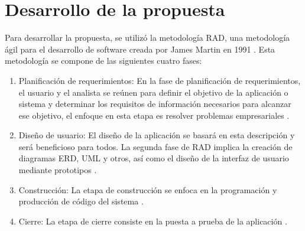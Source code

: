 \section{Desarrollo de la propuesta}
Para desarrollar la propuesta, se utilizó la metodología RAD, una metodología ágil para el desarrollo de software
creada por James Martin en 1991 \cite{agrawalUSINGRAPIDAPPLICATION2019}. Esta metodología se compone de las
siguientes cuatro fases:

\begin{enumerate}
    \item Planificación de requerimientos: En la fase de planificación de requerimientos, el usuario y el analista
          se reúnen para definir el objetivo de la aplicación o sistema y determinar los requisitos de información
          necesarios para alcanzar ese objetivo, el enfoque en esta etapa es resolver problemas empresariales \cite{maulanyDesignLearningApplications2021}.
    \item Diseño de usuario: El diseño de la aplicación se basará en esta descripción y será beneficioso para
          todos. La segunda fase de RAD implica la creación de diagramas ERD, UML y otros, así como el diseño de
          la interfaz de usuario mediante prototipos \cite{maulanyDesignLearningApplications2021}.
    \item Construcción: La etapa de construcción se enfoca en la programación y producción de código del sistema \cite{fauziSystematicLiteratureReviews2023}.
    \item Cierre: La etapa de cierre consiste en la puesta a prueba de la aplicación \cite{fauziSystematicLiteratureReviews2023}.
\end{enumerate}










